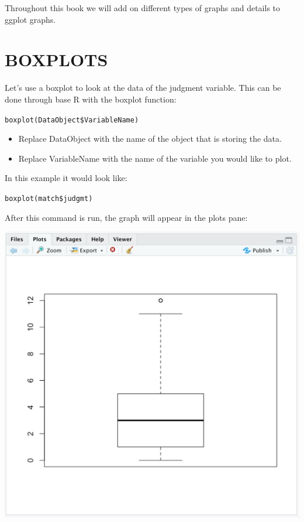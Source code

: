 \documentclass[
]{book}
\providecommand{\tightlist}{%
  \setlength{\itemsep}{0pt}\setlength{\parskip}{0pt}}
\begin{document}
Throughout this book we will add on different types of graphs and details to ggplot graphs.

\hypertarget{boxplots}{%
\section{BOXPLOTS}\label{boxplots}}

Let's use a boxplot to look at the data of the judgment variable. This can be done through base R with the boxplot function:

\texttt{boxplot(DataObject\$VariableName)}

\begin{itemize}
\tightlist
\item
  Replace DataObject with the name of the object that is storing the data.\\
\item
  Replace VariableName with the name of the variable you would like to plot.
\end{itemize}

In this example it would look like:

\texttt{boxplot(match\$judgmt)}

After this command is run, the graph will appear in the plots pane:

\includegraphics{img/2R.11.png}
\end{document}
